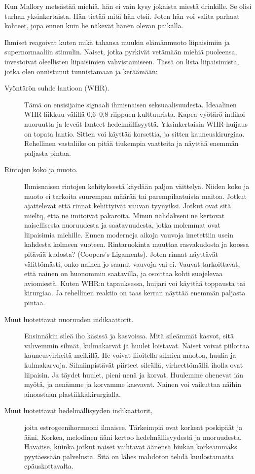 Kun Mallory metsästää miehiä, hän ei vain kysy jokaista miestä drinkille. Se olisi turhan yksinkertaista. Hän tietää mitä hän etsii. Joten hän voi valita parhaat kohteet, jopa ennen kuin he näkevät hänen olevan paikalla.

Ihmiset reagoivat kuten mikä tahansa muukin elämänmuoto liipaisimiin ja supernormaaliin stimulin. Naiset, jotka pyrkivät vetämään miehiä puoleensa, investoivat oleellisten liipaisimien vahvistamiseen. Tässä on lista liipaisimista, jotka olen onnistunut tunnistamaan ja keräämään:
\begin{description}
\item[Vyöntärön suhde lantioon (WHR).] Tämä on ensisijaine signaali ihmisnaisen seksuaalisuudesta. Ideaalinen WHR liikkuu välillä 0,6--0,8 riippuen kulttuurista. Kapea vyötärö indikoi nuoruutta ja leveät lanteet hedelmällisyyttä. Yksinkertaisin WHR-huijaus on topata lantio. Sitten voi käyttää korsettia, ja sitten kauneuskirurgiaa. Rehellinen vastaliike on pitää tiukempia vaatteita ja näyttää enemmän paljasta pintaa.
\item[Rintojen koko ja muoto.] Ihmisnaisen rintojen kehityksestä käydään paljon väittelyä. Niiden koko ja muoto ei tarkoita suurempaa määrää tai parempilaatuista maitoa. Jotkut ajattelevat että rinnat kehittyivät vauvan tyynyiksi. Jotkut ovat sitä mieltq, että ne imitoivat pakaroita. Minun nähdäkseni ne kertovat naisellisesta nuoruudesta ja saatavuudesta, jotka molemmat ovat liipaisimia miehille. Ennen moderneja aikoja vauvoja imetettiin usein kahdesta kolmeen vuoteen. Rintaruokinta muuttaa rasvakudosta ja koossa pitävää kudosta? (Coopers's Ligaments). Joten rinnat näyttävät välittömästi, onko nainen jo saanut vauvoja vai ei. Vauvat tarkoittavat, että nainen on huonommin saatavilla, ja osoittaa kohti suojelevaa aviomiestä. Kuten WHR:n tapauksessa, huijari voi käyttää toppausta tai kirurgiaa. Ja rehellinen reaktio on taas kerran näyttää enemmän paljasta pintaa.
\item[Muut luotettavat nuoruuden indikaattorit.] Ensinnäkin sileä iho käsissä ja kasvoissa. Mitä sileämmät kasvot, sitä vahvemmin silmät, kulmakarvat ja huulet loistavat. Naiset voivat piilottaa kauneusvirheitä meikillä. He voivat liioitella silmien muotoa, huulia ja kulmakarvoja. Silmiinpistävät piirteet sileällä, virheettömällä iholla ovat liipaisin. Ja täydet huulet, pieni nenä ja korvat. Huulemme ohenevat iän myötä, ja nenämme ja korvamme kasvavat. Nainen voi vaikuttaa näihin ainoastaan plastiikkakirurgialla.
\item[Muut luotettavat hedelmällisyyden indikaattorit,] joita estrogeenihormooni ilmaisee. Tärkeimpiä ovat korkeat poskipäät ja ääni. Korkea, melodinen ääni kertoo hedelmällisyydestä ja nuoruudesta. Havaitse, kuinka jotkut naiset vaihtavat äänensä hiukan korkeammaks pyytäessään palvelusta. Sitä on lähes mahdoton tehdä kuulostamatta epäuskottavalta.

\end{description}

